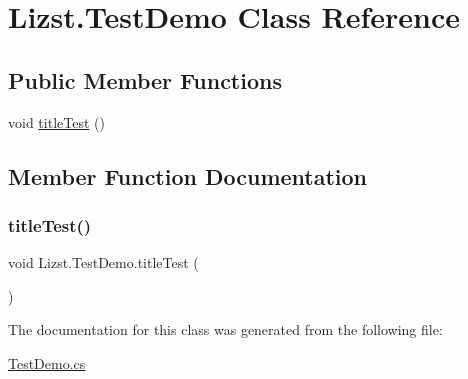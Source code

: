 \hypertarget{class_lizst_1_1_test_demo}{}\section{Lizst.\+Test\+Demo Class Reference}
\label{class_lizst_1_1_test_demo}
\subsection*{Public Member Functions}
\begin{DoxyCompactItemize}
\item 
void \mbox{\hyperlink{class_lizst_1_1_test_demo_ad73f7a5800da81755b0940950ddbd99e}{title\+Test}} ()
\end{DoxyCompactItemize}


\subsection{Member Function Documentation}
\mbox{\label{class_lizst_1_1_test_demo_ad73f7a5800da81755b0940950ddbd99e}} 
\subsubsection{\texorpdfstring{titleTest()}{titleTest()}}
{\footnotesize\ttfamily void Lizst.\+Test\+Demo.\+title\+Test (\begin{DoxyParamCaption}{ }\end{DoxyParamCaption})}



The documentation for this class was generated from the following file\+:\begin{DoxyCompactItemize}
\item 
\mbox{\hyperlink{_test_demo_8cs}{Test\+Demo.\+cs}}\end{DoxyCompactItemize}
